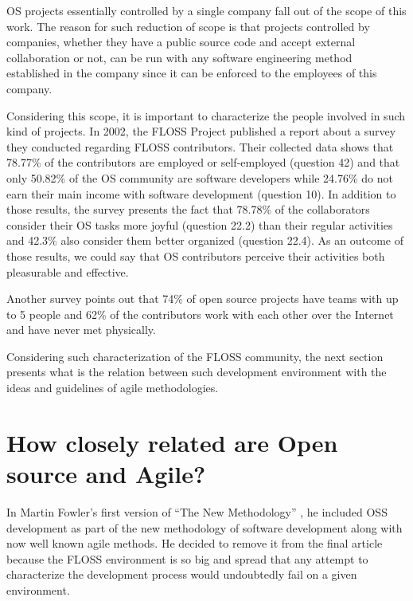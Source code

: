 \documentclass[lnbip]{svmultln}
\begin{document}
OS projects essentially controlled by a single company fall out of the
scope of this work. The reason for such reduction of scope is that
projects controlled by companies, whether they have a public source
code and accept external collaboration or not, can be run with any
software engineering method established in the company since it can be
enforced to the employees of this company.

Considering this scope, it is important to characterize the people
involved in such kind of projects. In 2002, the FLOSS Project
\cite{url:flossproject} published a report about a survey they
conducted regarding FLOSS contributors. Their collected data
\cite{url:flossdata} shows that 78.77\% of the contributors are
employed or self-employed (question 42) and that only 50.82\% of the
OS community are software developers while 24.76\% do not earn their
main income with software development (question 10).  In addition to
those results, the survey presents the fact that 78.78\% of the
collaborators consider their OS tasks more joyful (question 22.2) than
their regular activities and 42.3\% also consider them better
organized (question 22.4). As an outcome of those results, we could
say that OS contributors perceive their activities both pleasurable
and effective.


Another survey \cite{reis2003} points out that 74\% of open source
projects have teams with up to 5 people and 62\% of the contributors
work with each other over the Internet and have never met physically.

Considering such characterization of the FLOSS community, the next
section presents what is the relation between such development
environment with the ideas and guidelines of agile methodologies.

\section{How closely related are Open source and Agile?}
\label{sec:relation}

In Martin Fowler's first version of ``The New Methodology''
\cite{url:fowler2000orig}, he included OSS development as part of the
new methodology of software development along with now well known
agile methods. He decided to remove it from the final article because
the FLOSS environment is so big and spread that any attempt to
characterize the development process would undoubtedly fail on a given
environment.
\end{document}
